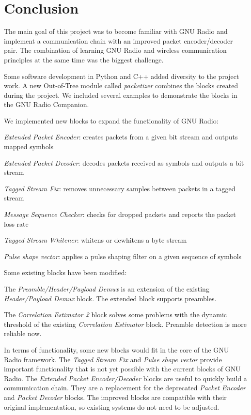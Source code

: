 \section{Conclusion}
The main goal of this project was to become familiar with GNU Radio and implement a communication chain with an improved packet encoder/decoder pair. The combination of learning GNU Radio and wireless communication principles at the same time was the biggest challenge. \medskip

Some software development in Python and C++ added diversity to the project work. A new Out-of-Tree module called \textit{packetizer} combines the blocks created during the project. We included several examples to demonstrate the blocks in the GNU Radio Companion. \medskip

We implemented new blocks to expand the functionality of GNU Radio:
\begin{tight_enumerate}
\item \textit{Extended Packet Encoder}: creates packets from a given bit stream and outputs mapped symbols
\item \textit{Extended Packet Decoder}: decodes packets received as symbols and outputs a bit stream
\item \textit{Tagged Stream Fix}: removes unnecessary samples between packets in a tagged stream
\item \textit{Message Sequence Checker}: checks for dropped packets and reports the packet loss rate
\item \textit{Tagged Stream Whitener}: whitens or dewhitens a byte stream
\item \textit{Pulse shape vector}: applies a pulse shaping filter on a given sequence of symbols
\end{tight_enumerate}

Some existing blocks have been modified:
\begin{tight_enumerate}
\item The \textit{Preamble/Header/Payload Demux} is an extension of the existing \textit{Header/Payload Demux} block. The extended block supports preambles.

\item The \textit{Correlation Estimator 2} block solves some problems with the dynamic threshold of the existing \textit{Correlation Estimator} block. Preamble detection is more reliable now.
\end{tight_enumerate}

In terms of functionality, some new blocks would fit in the core of the GNU Radio framework. The \textit{Tagged Stream Fix} and \textit{Pulse shape vector} provide important functionality that is not yet possible with the current blocks of GNU Radio. The \textit{Extended Packet Encoder/Decoder} blocks are useful to quickly build a communication chain. They are a replacement for the deprecated \textit{Packet Encoder} and \textit{Packet Decoder} blocks. The improved blocks are compatible with their original implementation, so existing systems do not need to be adjusted.

